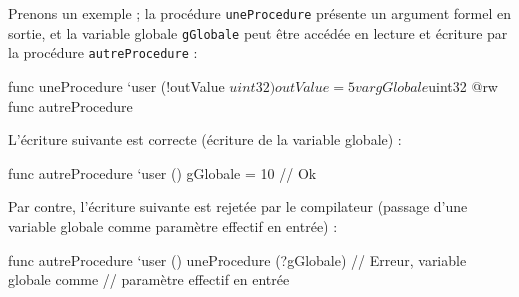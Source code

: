 Prenons un exemple ; la procédure \texttt{uneProcedure} présente un argument formel en sortie, et la variable globale \texttt{gGlobale} peut être accédée en lecture et écriture par la procédure \texttt{autreProcedure} :
\begin{PLM}
func uneProcedure `user (!outValue $uint32) {
  outValue = 5
}

var gGlobale $uint32 {
  @rw func autreProcedure
}
\end{PLM}

L'écriture suivante est correcte (écriture de la variable globale) :
\begin{PLM}
func autreProcedure `user () {
  gGlobale = 10 // Ok
}
\end{PLM}


Par contre, l'écriture suivante est rejetée par le compilateur (passage d'une variable globale comme paramètre effectif en entrée) :
\begin{PLM}
func autreProcedure `user () {
  uneProcedure (?gGlobale) // Erreur, variable globale comme
                           // paramètre effectif en entrée
}
\end{PLM}

